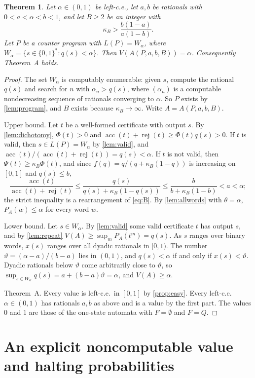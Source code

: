 \documentclass[11pt]{article}
\theoremstyle{plain}
\newtheorem{theorem}{Theorem}[section]
\theoremstyle{definition}
\theoremstyle{remark}
\newcommand{\acc}{\operatorname{acc}}
\newcommand{\rej}{\operatorname{rej}}
\begin{document}
\begin{theorem}\label{thm:mainA}
Let $\alpha\in(0,1)$ be left-c.e., let $a,b$ be rationals with $0<a<\alpha<b<1$, and let $B\ge2$ be an integer with
\begin{equation}\label{eq:B}
\kappa_B>\frac{b(1-a)}{a(1-b)}.
\end{equation}
Let $P$ be a counter program with $L(P)=W_\alpha$, where $W_\alpha=\{s\in\{0,1\}^*:q(s)<\alpha\}$. Then $V(A(P,a,b,B))=\alpha$. Consequently Theorem~A holds.
\end{theorem}

\begin{proof}
The set $W_\alpha$ is computably enumerable: given $s$, compute the rational $q(s)$ and search for $n$ with $\alpha_n>q(s)$, where $(\alpha_n)$ is a computable nondecreasing sequence of rationals converging to $\alpha$. So $P$ exists by \cref{lem:program}, and $B$ exists because $\kappa_B\to\infty$. Write $A=A(P,a,b,B)$.

Upper bound. Let $t$ be a well-formed certificate with output $s$. By \cref{lem:dichotomy}, $\Phi(t)>0$ and $\acc(t)+\rej(t)\ge\Phi(t)q(s)>0$. If $t$ is valid, then $s\in L(P)=W_\alpha$ by \cref{lem:valid}, and $\acc(t)/(\acc(t)+\rej(t))=q(s)<\alpha$. If $t$ is not valid, then $\Psi(t)\ge\kappa_B\Phi(t)$, and since $f(q)=q/(q+\kappa_B(1-q))$ is increasing on $[0,1]$ and $q(s)\le b$,
\[
\frac{\acc(t)}{\acc(t)+\rej(t)}\le\frac{q(s)}{q(s)+\kappa_B(1-q(s))}\le\frac{b}{b+\kappa_B(1-b)}<a<\alpha ;
\]
the strict inequality is a rearrangement of \eqref{eq:B}. By \cref{lem:allwords} with $\theta=\alpha$, $P_A(w)\le\alpha$ for every word $w$.

Lower bound. Let $s\in W_\alpha$. By \cref{lem:valid} some valid certificate $t$ has output $s$, and by \cref{lem:repeat} $V(A)\ge\sup_mP_A(t^m)=q(s)$. As $s$ ranges over binary words, $x(s)$ ranges over all dyadic rationals in $[0,1)$. The number $\vartheta=(\alpha-a)/(b-a)$ lies in $(0,1)$, and $q(s)<\alpha$ if and only if $x(s)<\vartheta$. Dyadic rationals below $\vartheta$ come arbitrarily close to $\vartheta$, so $\sup_{s\in W_\alpha}q(s)=a+(b-a)\vartheta=\alpha$, and $V(A)\ge\alpha$.

Theorem~A. Every value is left-c.e.\ in $[0,1]$ by \cref{prop:easy}. Every left-c.e.\ $\alpha\in(0,1)$ has rationals $a,b$ as above and is a value by the first part. The values $0$ and $1$ are those of the one-state automata with $F=\emptyset$ and $F=Q$.
\end{proof}

\section{An explicit noncomputable value and halting probabilities}\label{sec:example}
\end{document}
